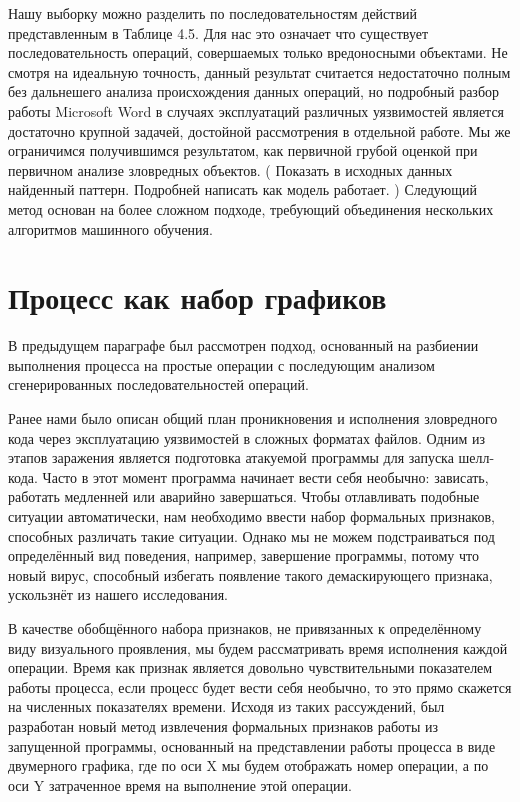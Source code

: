 Нашу выборку можно разделить по последовательностям действий представленным в Таблице 4.5. Для нас это означает что существует последовательность операций, совершаемых только вредоносными объектами. Не смотря на идеальную точность, данный результат считается недостаточно полным без дальнешего анализа происхождения данных операций, но подробный разбор работы Microsoft Word в случаях эксплуатаций различных уязвимостей является достаточно крупной задачей, достойной рассмотрения в отдельной работе. Мы же ограничимся получившимся результатом, как первичной грубой оценкой при первичном анализе зловредных объектов. ( Показать в исходных данных найденный паттерн. Подробней написать как модель    работает. )
Следующий метод основан на более сложном подходе, требующий объединения нескольких алгоритмов машинного обучения.

\section{Процесс как набор графиков}

В предыдущем параграфе был рассмотрен подход, основанный на разбиении выполнения процесса на простые операции с последующим анализом сгенерированных последовательностей операций.

Ранее нами было описан общий план проникновения и исполнения зловредного кода через эксплуатацию уязвимостей в сложных форматах файлов. Одним из этапов заражения является подготовка атакуемой программы для запуска шелл-кода. Часто в этот момент программа начинает вести себя необычно: зависать, работать медленней или аварийно завершаться. Чтобы отлавливать подобные ситуации автоматически, нам необходимо ввести набор формальных признаков, способных различать такие ситуации. Однако мы не можем подстраиваться под определённый вид поведения, например, завершение программы, потому что новый вирус, способный избегать появление такого демаскирующего признака, ускользнёт из нашего исследования.

В качестве обобщённого набора признаков, не привязанных к определённому виду визуального проявления, мы будем рассматривать время исполнения каждой операции. Время как признак является довольно чувствительными показателем работы процесса, если процесс будет вести себя необычно, то это прямо скажется на численных показателях времени. Исходя из таких рассуждений, был разработан новый метод извлечения формальных признаков работы из запущенной программы, основанный на представлении работы процесса в виде двумерного графика, где по оси X мы будем отображать номер операции, а по оси Y затраченное время на выполнение этой операции. 

